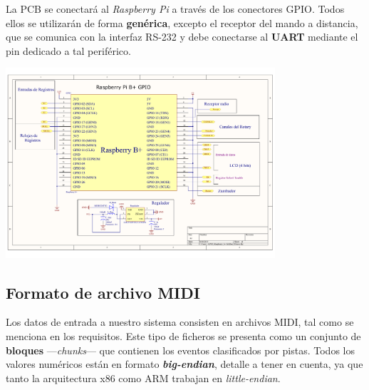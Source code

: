 \documentclass[10pt,a4paper]{article}
\begin{document}
	 La PCB se conectará al \textit{Raspberry Pi} a través de los conectores GPIO. Todos ellos se utilizarán de forma \textbf{genérica}, excepto el receptor del mando a distancia, que se comunica con la interfaz RS-232 y debe conectarse al \textbf{UART} mediante el pin dedicado a tal periférico.
	 
	 \begin{center}
	 	\includegraphics[width=0.75\textwidth]{images/pcb_gpio}
	 \end{center}
	
	\subsection{Formato de archivo MIDI}
	
	Los datos de entrada a nuestro sistema consisten en archivos MIDI, tal como se menciona en los requisitos. Este tipo de ficheros se presenta como un conjunto de \textbf{bloques} ---\textit{chunks}--- que contienen los eventos clasificados por pistas. Todos los valores numéricos están en formato \textbf{\textit{big-endian}}, detalle a tener en cuenta, ya que tanto la arquitectura x86 como ARM trabajan en \textit{little-endian}.
	
\end{document}
